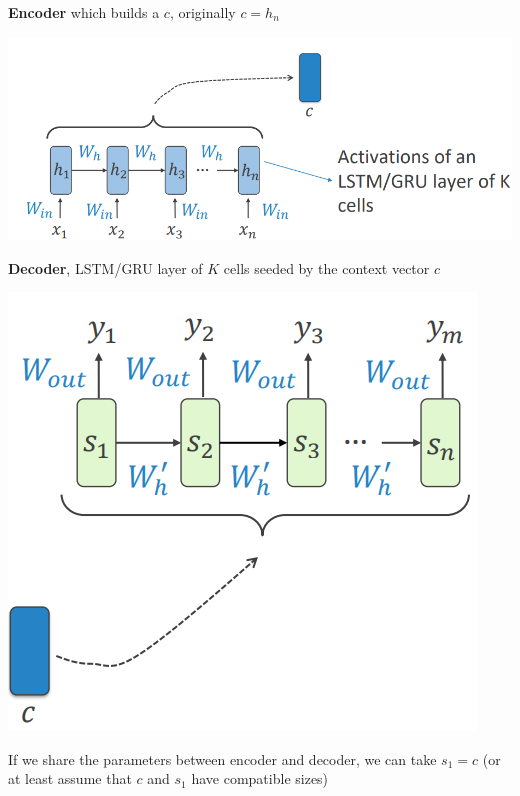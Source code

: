 \documentclass[10pt]{report}
\begin{document}
\begin{list}{}{}
	\item \textbf{Encoder} which builds a $c$, originally $c=h_n$
	\begin{center}
		\includegraphics[scale=0.45]{108.png}
	\end{center}
	\item \textbf{Decoder}, LSTM/GRU layer of $K$ cells seeded by the context vector $c$
	\begin{center}
		\includegraphics[scale=0.45]{109.png}
	\end{center}
	If we share the parameters between encoder and decoder, we can take $s_1 = c$ (or at least assume that $c$ and $s_1$ have compatible sizes)
	\begin{center}

\end{center}
\end{list}
\end{document}
